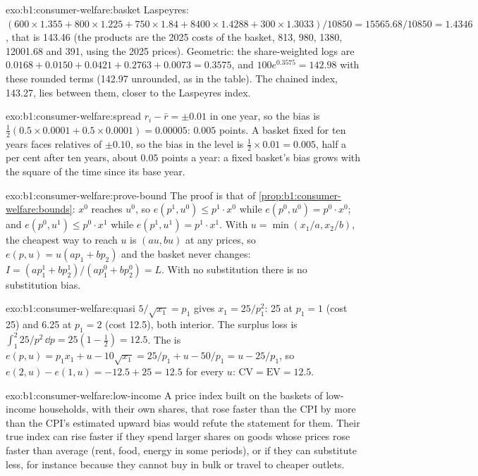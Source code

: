 \begin{solution}{exo:b1:consumer-welfare:basket}
Laspeyres: $(600 \times 1.355 + 800 \times 1.225 + 750 \times 1.84 + 8400 \times 1.4288 + 300 \times 1.3033)/10850
= 15565.68/10850 = 1.4346$, that is 143.46 (the products are the 2025 costs of the
basket, 813, 980, 1380, 12001.68 and 391, using the 2025 prices). Geometric:
the share-weighted logs are $0.0168 + 0.0150 + 0.0421 + 0.2763 + 0.0073 = 0.3575$,
and $100e^{0.3575} = 142.98$ with these rounded terms (142.97 unrounded, as in
the table). The chained index, 143.27, lies between them, closer to the
Laspeyres index.
\end{solution}

\begin{solution}{exo:b1:consumer-welfare:spread}
$r_i - \bar r = \pm 0.01$ in one year, so the bias is
$\tfrac12(0.5 \times 0.0001 + 0.5 \times 0.0001) = 0.00005$: $0.005$ points. A basket fixed
for ten years faces relatives of $\pm 0.10$, so the bias in the level is
$\tfrac12 \times 0.01 = 0.005$, half a per cent after ten years, about $0.05$
points a year: a fixed basket's bias grows with the square of the time
since its base year.
\end{solution}

\begin{solution}{exo:b1:consumer-welfare:prove-bound}
The proof is that of \cref{prop:b1:consumer-welfare:bounds}: $x^0$ reaches $u^0$,
so $e(p^1, u^0) \le p^1\cdot x^0$ while $e(p^0, u^0) = p^0\cdot x^0$; and
$e(p^0, u^1) \le p^0\cdot x^1$ while $e(p^1, u^1) = p^1\cdot x^1$. With
$u = \min(x_1/a, x_2/b)$, the cheapest way to reach $u$ is $(au, bu)$ at any
prices, so $e(p, u) = u(ap_1 + bp_2)$ and the basket never changes:
$I = (ap_1^1 + bp_2^1)/(ap_1^0 + bp_2^0) = L$. With no substitution there is no
substitution bias.
\end{solution}

\begin{solution}{exo:b1:consumer-welfare:quasi}
$5/\sqrt{x_1} = p_1$ gives $x_1 = 25/p_1^2$: 25 at $p_1 = 1$ (cost 25) and 6.25 at
$p_1 = 2$ (cost 12.5), both interior. The surplus loss is
$\int_1^2 25/p^2\,\dd p = 25(1 - \tfrac12) = 12.5$. The  is
$e(p, u) = p_1x_1 + u - 10\sqrt{x_1} = 25/p_1 + u - 50/p_1 = u - 25/p_1$, so
$e(2, u) - e(1, u) = -12.5 + 25 = 12.5$ for every $u$: $\mathrm{CV} = \mathrm{EV} = 12.5$.
\end{solution}

\begin{solution}{exo:b1:consumer-welfare:low-income}
A price index built on the baskets of low-income households, with their own
shares, that rose faster than the CPI by more than the CPI's estimated
upward bias would refute the statement for them. Their true index can rise
faster if they spend larger shares on goods whose prices rose faster than
average (rent, food, energy in some periods), or if they can substitute
less, for instance because they cannot buy in bulk or travel to cheaper
outlets.
\end{solution}

